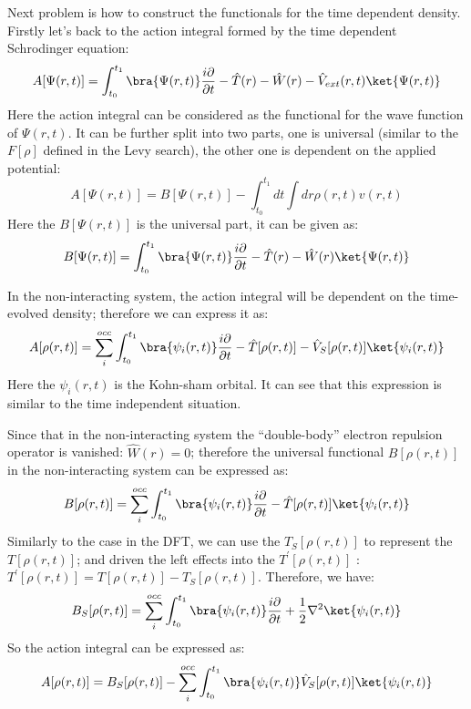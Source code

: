 Next problem is how to construct the functionals for the time
dependent density. Firstly let's back to the action integral formed
by the time dependent Schrodinger equation:
\begin{equation}\label{}
A[\Psi(r, t)] = \int^{t_{1}}_{t_{0}}\bra{\Psi(r,
t)}\frac{i\partial}{\partial
t}-\hat{T}(r)-\hat{W}(r)-\hat{V}_{ext}(r,t)\ket{\Psi(r,t)}
\end{equation}
Here the action integral can be considered as the functional for the
wave function of $\Psi(r, t)$. It can be further split into two
parts, one is universal (similar to the $F[\rho]$ defined in the
Levy search), the other one is dependent on the applied potential:
\begin{equation}\label{}
A[\Psi(r, t)] = B[\Psi(r, t)] - \int^{t_{1}}_{t_{0}}dt \int
dr\rho(r,t)v(r,t)
\end{equation}
Here the $B[\Psi(r, t)]$ is the universal part, it can be given as:
\begin{equation}\label{}
B[\Psi(r, t)] = \int^{t_{1}}_{t_{0}}\bra{\Psi(r,
t)}\frac{i\partial}{\partial t}-\hat{T}(r)-\hat{W}(r)\ket{\Psi(r,t)}
\end{equation}

In the non-interacting system, the action integral will be dependent
on the time-evolved density; therefore we can express it as:
\begin{equation}\label{TDDFTeq:13}
A[\rho(r,t)] = \sum_{i}^{occ}\int^{t_{1}}_{t_{0}}\bra{\psi_{i}(r,
t)}\frac{i\partial}{\partial
t}-\hat{T}[\rho(r,t)]-\hat{V}_{S}[\rho(r,t)]\ket{\psi_{i}(r,t)}
\end{equation}
Here the $\psi_{i}(r, t)$ is the Kohn-sham orbital. It can see that
this expression is similar to the time independent situation.

Since that in the non-interacting system the ``double-body''
electron repulsion operator is vanished: $\hat{W}(r) = 0$; therefore
the universal functional $B[\rho(r,t)]$ in the non-interacting
system can be expressed as:
\begin{equation}\label{}
B[\rho(r,t)] = \sum_{i}^{occ}\int^{t_{1}}_{t_{0}}\bra{\psi_{i}(r,
t)}\frac{i\partial}{\partial
t}-\hat{T}[\rho(r,t)]\ket{\psi_{i}(r,t)}
\end{equation}
Similarly to the case in the DFT, we can use the $T_{S}[\rho(r,t)]$
to represent the $T[\rho(r,t)]$; and driven the left effects into
the $T^{'}[\rho(r,t)]$ : $T^{'}[\rho(r,t)] = T[\rho(r,t)] -
T_{S}[\rho(r,t)]$. Therefore, we have:
\begin{equation}\label{}
B_{S}[\rho(r,t)] =
\sum_{i}^{occ}\int^{t_{1}}_{t_{0}}\bra{\psi_{i}(r,
t)}\frac{i\partial}{\partial
t}+\frac{1}{2}\nabla^{2}\ket{\psi_{i}(r,t)}
\end{equation}
So the action integral can be expressed as:
\begin{equation}\label{}
A[\rho(r,t)] = B_{S}[\rho(r,t)] -
\sum_{i}^{occ}\int^{t_{1}}_{t_{0}}\bra{\psi_{i}(r,
t)}\hat{V}_{S}[\rho(r,t)]\ket{\psi_{i}(r,t)}
\end{equation}

